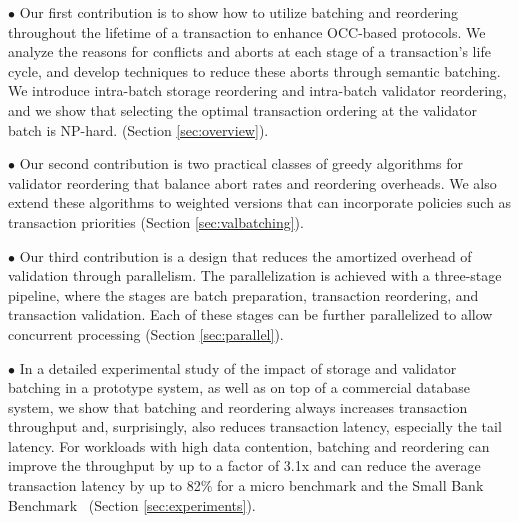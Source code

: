 $\bullet$ Our first contribution is to show how to utilize batching and reordering throughout the lifetime of a transaction to enhance OCC-based protocols. We analyze the reasons for conflicts and aborts at each stage of a transaction's life cycle, and develop techniques to reduce these aborts through semantic batching.
We introduce intra-batch storage reordering and
intra-batch validator reordering, and we show that selecting the
optimal transaction ordering at the validator batch is NP-hard.
(Section \ref{sec:overview}).


$\bullet$ Our second contribution is 
two practical classes of greedy algorithms for validator reordering 
that balance abort rates and reordering overheads.
We also extend these algorithms to weighted versions that can
incorporate policies such as transaction priorities (Section \ref{sec:valbatching}).


$\bullet$ Our third contribution is a design that reduces the amortized overhead of validation through parallelism. The parallelization is achieved with a three-stage pipeline, where the stages are batch preparation, transaction reordering, and transaction validation. Each of these stages can be further parallelized to allow concurrent processing (Section \ref{sec:parallel}).

$\bullet$ In a detailed experimental study of the impact of storage and validator batching in a prototype system, as well as on top of a commercial database system, we show that batching and reordering always increases transaction throughput and, surprisingly, also reduces transaction latency, especially the tail latency. For workloads with high data contention, batching and reordering can improve the throughput by up to a factor of 3.1x and can reduce the average transaction latency by up to 82\% for a micro benchmark and the Small Bank Benchmark~\cite{alomari2008icde} (Section \ref{sec:experiments}).

